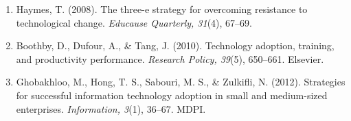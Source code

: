 \documentclass{article}
\begin{document}
\begin{enumerate}
    \item Haymes, T. (2008). The three-e strategy for overcoming resistance to technological change. \textit{Educause Quarterly, 31}(4), 67--69.

     \item Boothby, D., Dufour, A., & Tang, J. (2010). Technology adoption, training, and productivity performance. \textit{Research Policy, 39}(5), 650--661. Elsevier.

    \item Ghobakhloo, M., Hong, T. S., Sabouri, M. S., & Zulkifli, N. (2012). Strategies for successful information technology adoption in small and medium-sized enterprises. \textit{Information, 3}(1), 36--67. MDPI.
    
\end{enumerate}
\end{document}
